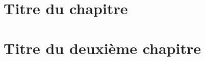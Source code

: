 \documentclass[%
    paper=A4,               %
    twoside=true,           %
    openright,              %
    chapterprefix=true,     %
    12pt,                   %
    headings=normal,        %
    bibliography=totoc,     %
    titlepage=on,           %
    captions=tableabove,    %
    draft=false             %
]{book}%
\begin{document}
\newcommand{\mainfile}{}

\nocite{*}





\clearpage{}

\clearpage{}

\clearpage{}

\clearpage{}

\clearpage{}

\clearpage{}

\clearpage{}



\clearpage{}

\chapter{Titre du chapitre}%
\label{chap:label-chapitre}
\clearpage{}
\clearpage{}

\chapter{Titre du deuxième chapitre}%
\label{chap:label-chapitre-2}
\clearpage{}
\clearpage{}
\end{document}
